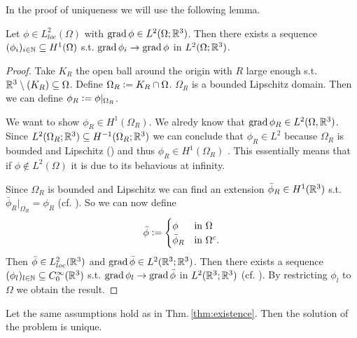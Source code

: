 \documentclass[../main.tex]{subfiles}
\begin{document}
In the proof of uniqueness we will use the following lemma. 
\begin{lemma}\label{lem:gradient_sequence}
    Let $\phi \in L^2_{loc}(\Omega)$ 
    with $\operatorname{grad} \phi \in L^2(\Omega;\mathbb{R}^3)$. Then 
    there exists a sequence $(\phi_i)_{i \in \mathbb{N}} \subseteq H^1(\Omega)$
    s.t. $\operatorname{grad} \phi_i \rightarrow \operatorname{grad} \phi$ in $L^2(\Omega;\mathbb{R}^3)$.
\end{lemma}
\begin{proof}
    Take $K_R$ the open ball around the origin with $R$ large enough 
    s.t. $\mathbb{R}^3 \setminus (K_R) \subseteq \Omega$. 
    Define $\Omega_R \vcentcolon= K_R \cap \Omega$. $\Omega_R$ is a bounded Lipschitz 
    domain.
    Then we can define $\phi_R \vcentcolon= \phi|_{\Omega_R}$.

    We want to show $\phi_R \in H^1(\Omega_R)$. We alredy know that $\operatorname{grad} \phi_R \in L^2(\Omega, \mathbb{R}^3)$.
    Since $L^2(\Omega_R; \mathbb{R}^3) \subseteq H^{-1}(\Omega_R;\mathbb{R}^3)$ we can conclude that 
    $\phi_R \in L^2$ because $\Omega_R$ is bounded and Lipschitz (\cite[Lemma 3.11]{monk}) 
    and thus $\phi_R \in H^1(\Omega_R)$ . This essentially means that 
    if $\phi \notin L^2(\Omega)$ it is due to its behavious at infinity.

    Since $\Omega_R$ is bounded and Lipschitz we can find an extension $\bar{\phi}_R \in H^1(\mathbb{R}^3)$ 
    s.t. $\bar{\phi}_R|_{\Omega_R} =\phi_R$ (cf. \cite[Sec.\,1.5.1]{mazya}).
    So we can now define
    \begin{align*}
    \bar{\phi} \vcentcolon=
    \begin{cases}
        \phi & \mbox{in $\Omega$}\\
        \bar{\phi}_R & \mbox{in $\Omega^c$.}\\
    \end{cases}
    \end{align*}
    Then $\bar{\phi} \in L^2_{loc}(\mathbb{R}^3)$ and 
    $\operatorname{grad} \bar{\phi} \in L^2(\mathbb{R}^3;\mathbb{R}^3)$. 
    Then there exists a sequence 
    $(\phi_l) _{l \in \mathbb{N}} \subseteq C^\infty_0(\mathbb{R}^3)$ s.t.
    $\operatorname{grad} \phi_l \rightarrow \operatorname{grad} \bar{\phi}$ in $L^2(\mathbb{R}^3;\mathbb{R}^3)$ 
    (cf. \cite[Lemma 1.1]{simader}). By restricting $\phi_l$ to $\Omega$ 
    we obtain the result.
\end{proof}


\begin{theorem}
    Let the same assumptions hold as in Thm.\,\ref{thm:existence}.
    Then the solution of the problem is unique.
\end{theorem}
\end{document}
